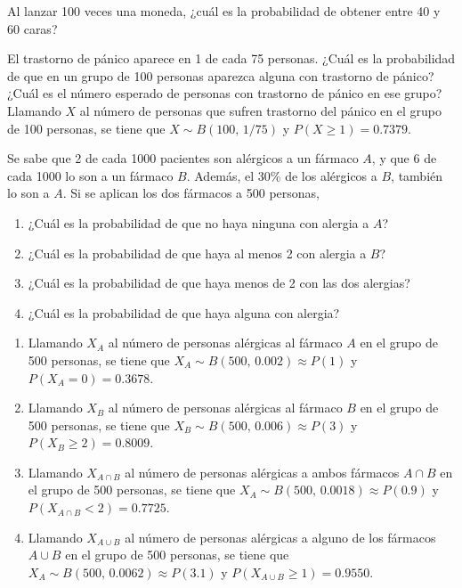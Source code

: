 {Al lanzar 100 veces una moneda, ¿cuál es la probabilidad de obtener entre 40 y 60 caras?
}
{}
{}


{El trastorno de pánico aparece en 1 de cada 75 personas.
¿Cuál es la probabilidad de que en un grupo de 100 personas aparezca alguna con trastorno de pánico?
¿Cuál es el número esperado de personas con trastorno de pánico en ese grupo?
}
{Llamando $X$ al número de personas que sufren trastorno del pánico en el grupo de 100 personas, se tiene que $X\sim
B(100,\,1/75)$ y $P(X\geq 1)=0.7379$.}
{}


{Se sabe que 2 de cada 1000 pacientes son alérgicos a un fármaco $A$, y que 6 de cada 1000 lo son a un fármaco $B$.
Además, el 30\% de los alérgicos a $B$, también lo son a $A$.
Si se aplican los dos fármacos a 500 personas,
\begin{enumerate}
\item ¿Cuál es la probabilidad de que no haya ninguna con alergia a $A$?
\item ¿Cuál es la probabilidad de que haya al menos 2 con alergia a $B$?
\item ¿Cuál es la probabilidad de que haya menos de 2 con las dos alergias?
\item ¿Cuál es la probabilidad de que haya alguna con alergia?
\end{enumerate}
}
{
\begin{enumerate}
\item Llamando $X_A$ al número de personas alérgicas al fármaco $A$ en el grupo de 500 personas, se tiene que $X_A\sim
B(500,\,0.002)\approx P(1)$ y $P(X_A=0)=0.3678$.
\item Llamando $X_B$ al número de personas alérgicas al fármaco $B$ en el grupo de 500 personas, se tiene que $X_B\sim
B(500,\,0.006)\approx P(3)$ y $P(X_B\geq 2)=0.8009$.
\item Llamando $X_{A\cap B}$ al número de personas alérgicas a ambos fármacos $A\cap B$ en el grupo de 500 personas, se
tiene que $X_A\sim B(500,\,0.0018)\approx P(0.9)$ y $P(X_{A\cap B}<2)=0.7725$.
\item Llamando $X_{A\cup B}$ al número de personas alérgicas a alguno de los fármacos $A\cup B$ en el grupo de 500
personas, se tiene que $X_A\sim B(500,\,0.0062)\approx P(3.1)$ y $P(X_{A\cup B}\geq 1)=0.9550$.
\end{enumerate}
}
{}


